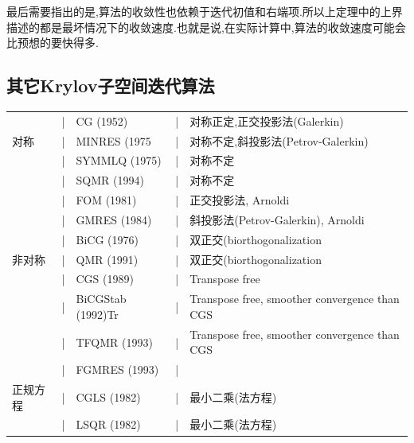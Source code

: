 \documentclass[12pt,a4paper]{article}
\begin{document}
最后需要指出的是,算法的收敛性也依赖于迭代初值和右端项.所以上定理中的上界描述的都是最坏情况下的收敛速度.也就是说,在实际计算中,算法的收敛速度可能会比预想的要快得多.
\subsection{其它Krylov子空间迭代算法}
\begin{tabular}{lllll}
	\hline
	&|&CG (1952)&|&对称正定,正交投影法(Galerkin)\\
	对称&|&MINRES (1975&|&对称不定,斜投影法(Petrov-Galerkin)\\
	&|&SYMMLQ (1975)&|&对称不定\\
	&|&SQMR (1994)&|&对称不定\\
	\hline
	&|&FOM (1981)&|&正交投影法, Arnoldi\\
	&|&GMRES (1984)&|&斜投影法(Petrov-Galerkin), Arnoldi\\
	&|&BiCG (1976)&|&双正交(biorthogonalization\\
	非对称&|&QMR (1991)&|&双正交(biorthogonalization\\
	&|&CGS (1989)&|&Transpose free\\
	&|&BiCGStab (1992)Tr&|&Transpose free, smoother convergence than CGS\\
	&|&TFQMR (1993)&|&Transpose free, smoother convergence than CGS\\
	&|&FGMRES (1993)&|&{}\\
	\hline
	正规方程&|&CGLS (1982)&|&最小二乘(法方程)\\
	&|&LSQR (1982)&|&最小二乘(法方程)\\
	\hline
\end{tabular}
\end{document}
